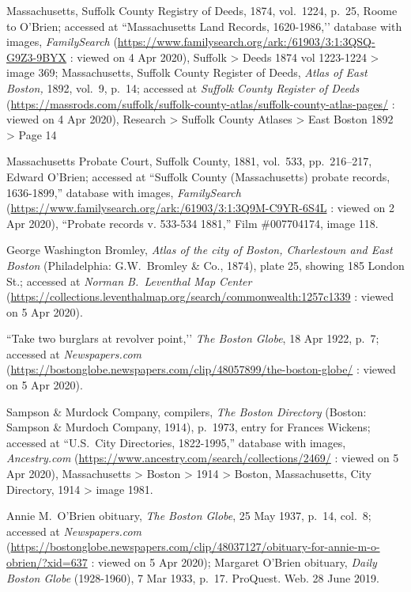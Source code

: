 \begin{thebibliography}{999}
Massachusetts, Suffolk County Registry of Deeds, 1874, vol.\ 1224, p.\ 25, Roome to O’Brien; accessed at ``Massachusetts Land Records, 1620-1986,’’ database with images, \textit{FamilySearch} (\url{https://www.familysearch.org/ark:/61903/3:1:3QSQ-G9Z3-9BYX} : viewed on 4 Apr 2020), Suffolk > Deeds 1874 vol 1223-1224 > image 369; Massachusetts, Suffolk County Register of Deeds, \textit{Atlas of East Boston,} 1892, vol.\ 9, p.\ 14; accessed at \textit{Suffolk County Register of Deeds} (\url{https://massrods.com/suffolk/suffolk-county-atlas/suffolk-county-atlas-pages/} : viewed on 4 Apr 2020), Research > Suffolk County Atlases > East Boston 1892 > Page 14

Massachusetts Probate Court, Suffolk County, 1881, vol.\ 533, pp.\ 216--217, Edward O'Brien; accessed at ``Suffolk County (Massachusetts) probate records, 1636-1899,'' database with images, \textit{FamilySearch} (\url{https://www.familysearch.org/ark:/61903/3:1:3Q9M-C9YR-6S4L} : viewed on 2 Apr 2020), ``Probate records v. 533-534 1881,'' Film \#007704174, image 118.

George Washington Bromley, \textit{Atlas of the city of Boston, Charlestown and East Boston} (Philadelphia: G.W.\ Bromley \& Co., 1874), plate 25, showing 185 London St.; accessed at \textit{Norman B.\ Leventhal Map Center} (\url{https://collections.leventhalmap.org/search/commonwealth:1257c1339} : viewed on 5 Apr 2020).

``Take two burglars at revolver point,’’ \textit{The Boston Globe}, 18 Apr 1922, p.\ 7; accessed at \textit{Newspapers.com} (\url{https://bostonglobe.newspapers.com/clip/48057899/the-boston-globe/} : viewed on 5 Apr 2020).

Sampson \& Murdock Company, compilers, \textit{The Boston Directory} (Boston: Sampson \& Murdoch Company, 1914), p.\ 1973, entry for Frances Wickens; accessed at ``U.S.\ City Directories, 1822-1995,'' database with images, \textit{Ancestry.com} (\url{https://www.ancestry.com/search/collections/2469/} : viewed on 5 Apr 2020), Massachusetts > Boston > 1914 > Boston, Massachusetts, City Directory, 1914 > image 1981.

Annie M.\ O'Brien obituary, \textit{The Boston Globe}, 25 May 1937, p.\ 14, col.\ 8; accessed at \textit{Newspapers.com} (\url{https://bostonglobe.newspapers.com/clip/48037127/obituary-for-annie-m-o-obrien/?xid=637} : viewed on 5 Apr 2020); Margaret O'Brien obituary, \textit{Daily Boston Globe} (1928-1960), 7 Mar 1933, p.\ 17. ProQuest. Web. 28 June 2019. 


\end{thebibliography}
